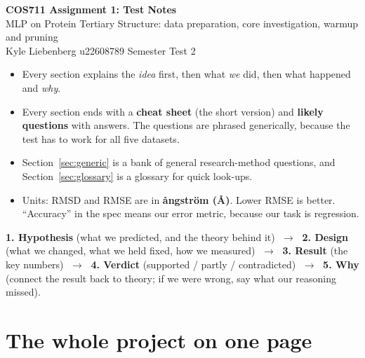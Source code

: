 \documentclass[11pt,a4paper]{article}
\begin{document}
\begin{center}
{\LARGE\bfseries COS711 Assignment 1: Test Notes}\\[0.4em]
{\large MLP on Protein Tertiary Structure: data preparation, core investigation, warmup and pruning}\\[0.3em]
{\small Kyle Liebenberg \quad u22608789 \quad Semester Test 2}
\end{center}

\begin{keyidea}
\begin{itemize}
  \item Every section explains the \emph{idea} first, then what \emph{we} did, then what happened and \emph{why}.
  \item Every section ends with a \textbf{cheat sheet} (the short version) and \textbf{likely questions} with
        answers. The questions are phrased generically, because the test has to work for all five datasets.
  \item Section~\ref{sec:generic} is a bank of general research-method questions, and Section~\ref{sec:glossary}
        is a glossary for quick look-ups.
  \item Units: RMSD and RMSE are in \textbf{ångström (\AA)}. Lower RMSE is better. ``Accuracy'' in the spec means
        our error metric, because our task is regression.
\end{itemize}
\end{keyidea}

\begin{keyidea}
\textbf{1. Hypothesis} (what we predicted, and the theory behind it) $\;\to\;$
\textbf{2. Design} (what we changed, what we held fixed, how we measured) $\;\to\;$
\textbf{3. Result} (the key numbers) $\;\to\;$
\textbf{4. Verdict} (supported / partly / contradicted) $\;\to\;$
\textbf{5. Why} (connect the result back to theory; if we were wrong, say what our reasoning missed).
\end{keyidea}

\tableofcontents
\newpage

\section{The whole project on one page}
\label{sec:overview}
\end{document}
